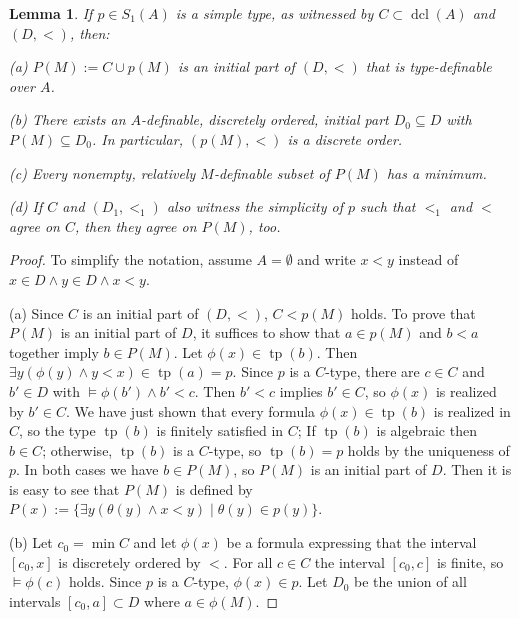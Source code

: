 \documentclass[10pt,a4paper]{amsart}
\newtheorem{Lemma}[Theorem]{Lemma}
\theoremstyle{definition}
\DeclareMathOperator{\dcl}{dcl}
\DeclareMathOperator{\tp}{tp}
\begin{document}
\begin{Lemma}\label{Lemma_basic_simple}
If   $p\in S_1(A)$ is a simple type, as witnessed by $C\subset\dcl(A)$ and $(D,<)$, then:

(a) $P(M):=C\cup p(M)$ is an initial part  of $(D,<)$ that is type-definable over $A$.

(b) There exists an  $A$-definable, discretely ordered, initial part $D_0\subseteq D$  with $P(M)\subseteq D_0$. In particular, $(p(M),<)$ is a discrete order.  

(c) Every nonempty, relatively $M$-definable subset of  $P(M)$ has a  minimum.  

(d) If $C$ and $(D_1,<_1)$ also witness the simplicity of $p$ such that $<_1$ and $<$ agree on $C$, then they agree on $P(M)$, too. 
\end{Lemma}
\begin{proof}To simplify the notation, assume $A=\emptyset$ and  write $x<y$ instead of $x\in D\land y\in D\land x<y$. 

(a) Since $C$ is an initial part of $(D,<)$,    $C<p(M)$ holds. 
To prove that $P(M)$ is an initial part of $D$, it suffices to show that $a\in p(M)$ and $b< a$ together imply $b\in P(M)$. Let $\phi(x)\in \tp(b)$. 
Then  $\exists y(\phi(y)\land y< x)\in\tp(a)=p$. Since $p$ is   a $C$-type, there are $c\in C$ and $b'\in D$ with $\models\phi(b')\land b'< c$.
Then $b'< c$ implies $b'\in C$, so   $\phi(x)$ is realized by $b'\in C$. We have just shown that every formula $\phi(x)\in \tp(b)$ is realized in $C$, so the type $\tp(b)$ is finitely satisfied in $C$; 
If $\tp(b)$ is algebraic  then $b\in C$; otherwise, $\tp (b)$ is a $C$-type, so $\tp(b)=p$ holds by the uniqueness of $p$.
In both cases we have $b\in P(M)$, so $P(M)$ is an initial part of $D$. Then it is is easy to see that $P(M)$ is defined by  $P(x):=\{\exists y(\theta(y) \land   x<y)\mid \theta(y)\in p(y)\}$. 

\smallskip
(b) Let $c_0=\min C$ and let $\phi(x)$ be a formula expressing that the interval $[c_0,x]$ is discretely ordered by $<$.  For all $c\in C$ the interval $[c_0,c]$ is finite, so $\models  \phi(c)$ holds. Since $p$ is a $C$-type, $\phi(x)\in p$. Let $D_0$ be the union of all intervals $[c_0,a]\subset D$ where $a\in\phi(M)$.  


\end{proof}
\end{document}
